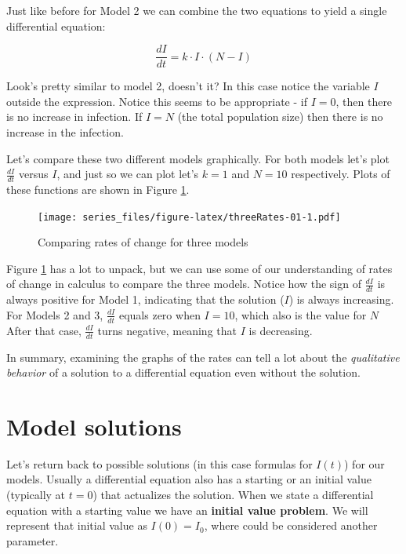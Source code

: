 \documentclass[
]{book}
\theoremstyle{definition}
\theoremstyle{definition}
\theoremstyle{definition}
\theoremstyle{remark}
\begin{document}
Just like before for Model 2 we can combine the two equations to yield a single differential equation:

\begin{equation}
\frac{dI}{dt} = k\cdot I \cdot (N-I)
\end{equation}

Look's pretty similar to model 2, doesn't it? In this case notice the variable \(I\) outside the expression. Notice this seems to be appropriate - if \(I=0\), then there is no increase in infection. If \(I=N\) (the total population size) then there is no increase in the infection.

Let's compare these two different models graphically. For both models let's plot \(\displaystyle \frac{dI}{dt}\) versus \(I\), and just so we can plot let's \(k=1\) and \(N=10\) respectively. Plots of these functions are shown in Figure \ref{fig:threeRates-01}.

\begin{figure}
\centering
\texttt{[image: series\_files/figure-latex/threeRates-01-1.pdf]}
\caption{\label{fig:threeRates-01}Comparing rates of change for three models}
\end{figure}

Figure \ref{fig:threeRates-01} has a lot to unpack, but we can use some of our understanding of rates of change in calculus to compare the three models. Notice how the sign of \(\displaystyle \frac{dI}{dt}\) is always positive for Model 1, indicating that the solution (\(I\)) is always increasing. For Models 2 and 3, \(\displaystyle \frac{dI}{dt}\) equals zero when \(I=10\), which also is the value for \(N\) After that case, \(\displaystyle \frac{dI}{dt}\) turns negative, meaning that \(I\) is decreasing.

In summary, examining the graphs of the rates can tell a lot about the \emph{qualitative behavior} of a solution to a differential equation even without the solution.

\hypertarget{model-solutions}{%
\section{Model solutions}\label{model-solutions}}

Let's return back to possible solutions (in this case formulas for \(I(t)\)) for our models. Usually a differential equation also has a starting or an initial value (typically at \(t=0\)) that actualizes the solution. When we state a differential equation with a starting value we have an \textbf{initial value problem}. We will represent that initial value as \(I(0)=I_{0}\), where could be considered another parameter.
\end{document}

